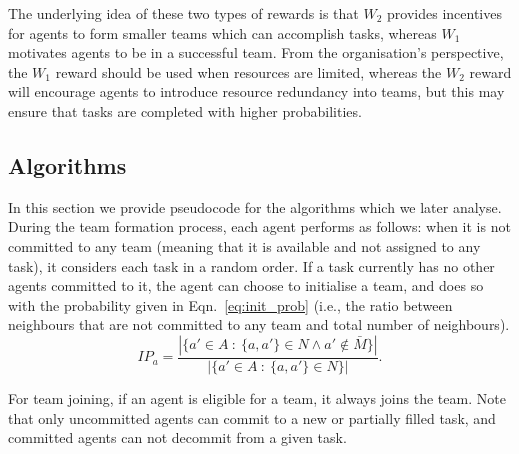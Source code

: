 \documentclass{llncs}
\begin{document}
The underlying idea of these two types of rewards is that $W_2$ provides
incentives for agents to form smaller teams which can accomplish tasks, whereas $W_1$
motivates agents to be in a successful team. From the organisation's perspective, the $W_1$ reward
should be used when resources are limited, whereas the $W_2$ reward will encourage agents to introduce
resource redundancy into teams, but this may ensure that tasks are completed with higher
probabilities.
\subsection{Algorithms}
In this section we provide pseudocode for the algorithms which we later analyse. During the team formation process, each agent performs as follows:
when it is not committed to any team (meaning that it is available and not assigned to any task), it considers each task in a random order. If a task currently
has no other agents committed to it, the agent can choose to initialise a team, and does so with the probability given in Eqn.~\eqref{eq:init_prob} (i.e.,
the ratio between neighbours that are not committed to any team and total number of neighbours).
\begin{equation}
IP_a = \frac{|\{ a' \in A\ :\ \{a, a'\} \in N \wedge a' \notin \bar{M}  \}|}{|\{ a' \in A\ :\ \{a, a'\} \in N \}|}.
\label{eq:init_prob}
\end{equation}

For team joining, if an agent is eligible for a team, it always joins the team. Note that only uncommitted agents can commit to
a new or partially filled task, and committed agents can not decommit from a given task.
%
\end{document}
